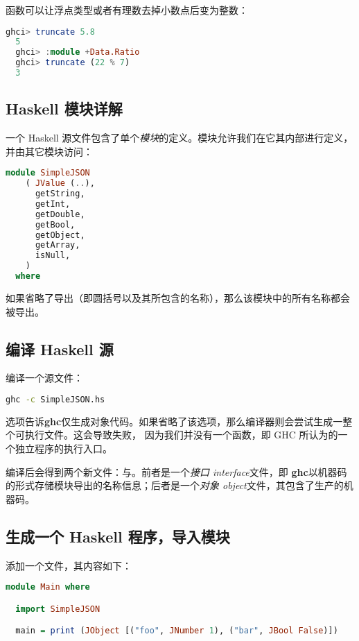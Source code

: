 \documentclass[./main.tex]{subfiles}
\begin{document}
函数可以让浮点类型或者有理数去掉小数点后变为整数：

\begin{lstlisting}[language=Haskell]
  ghci> truncate 5.8
  5
  ghci> :module +Data.Ratio
  ghci> truncate (22 % 7)
  3
\end{lstlisting}

\subsection*{Haskell 模块详解}

一个 Haskell 源文件包含了单个\textit{模块}的定义。模块允许我们在它其内部进行定义，并由其它模块访问：

\begin{lstlisting}[language=Haskell]
  module SimpleJSON
    ( JValue (..),
      getString,
      getInt,
      getDouble,
      getBool,
      getObject,
      getArray,
      isNull,
    )
  where
\end{lstlisting}

如果省略了导出（即圆括号以及其所包含的名称），那么该模块中的所有名称都会被导出。

\subsection*{编译 Haskell 源}

编译一个源文件：

\begin{lstlisting}[language=Bash]
  ghc -c SimpleJSON.hs
\end{lstlisting}

选项告诉\textbf{ghc}仅生成对象代码。如果省略了该选项，那么编译器则会尝试生成一整个可执行文件。这会导致失败，
因为我们并没有一个函数，即 GHC 所认为的一个独立程序的执行入口。

编译后会得到两个新文件：与。前者是一个\textit{接口 interface}文件，即
\textbf{ghc}以机器码的形式存储模块导出的名称信息；后者是一个\textit{对象 object}文件，其包含了生产的机器码。

\subsection*{生成一个 Haskell 程序，导入模块}

添加一个文件，其内容如下：

\begin{lstlisting}[language=Haskell]
  module Main where

  import SimpleJSON

  main = print (JObject [("foo", JNumber 1), ("bar", JBool False)])
\end{lstlisting}
\end{document}
